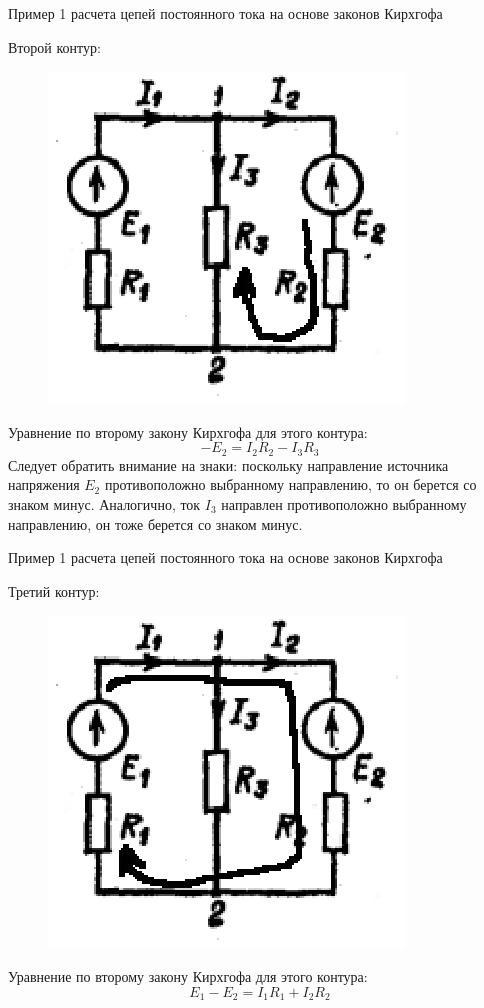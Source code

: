 \documentclass[10pt, pdf, hyperref={unicode},handout]{beamer}
\begin{document}
\begin{frame}{Пример 1  расчета цепей постоянного тока на основе законов Кирхгофа}
  \begin{block}

    \small{
  Второй контур:
\begin{figure}[htb] 
    \centering
    \includegraphics [scale=1.3]{ris4.eps}
  \end{figure}
  Уравнение по второму закону Кирхгофа для этого контура: $$-E_2=I_2R_2-I_3R_3$$
  Следует обратить внимание на знаки: поскольку направление источника напряжения $E_2$ противоположно выбранному направлению, то он берется со знаком минус. Аналогично, ток $I_3$ направлен противоположно выбранному направлению, он тоже берется со знаком минус.
}

  \end{block}
  
\end{frame}

\begin{frame}{Пример 1  расчета цепей постоянного тока на основе законов Кирхгофа}
  \begin{block}

    \small{
  Третий контур:
\begin{figure}[htb] 
    \centering
    \includegraphics [scale=1.3]{ris5.eps}
  \end{figure}
  Уравнение по второму закону Кирхгофа для этого контура: $$E_1-E_2=I_1R_1+I_2R_2$$
}

  \end{block}
  
\end{frame}
\end{document}
